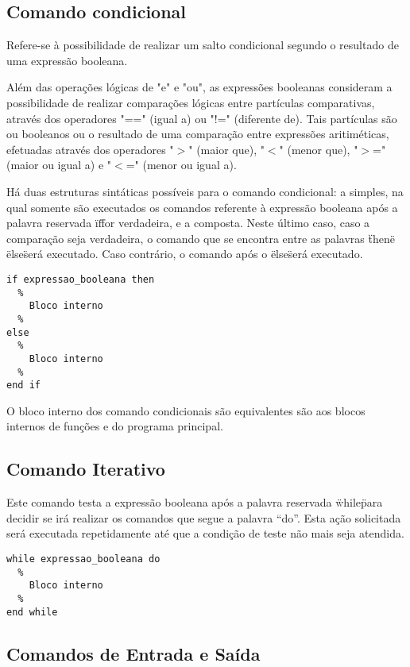   \subsection{Comando condicional}

  Refere-se à possibilidade de realizar um salto condicional segundo o resultado de uma expressão booleana. 

  Além das operações lógicas de "e" e "ou", as expressões booleanas consideram a possibilidade de realizar comparações lógicas entre partículas comparativas, através dos operadores "==" (igual a) ou "!=" (diferente de). Tais partículas são ou booleanos ou o resultado de uma comparação entre expressões aritiméticas, efetuadas através dos operadores "$>$" (maior que), "$<$" (menor que), "$>$=" (maior ou igual a) e "$<$=" (menor ou igual a).

  Há duas estruturas sintáticas possíveis para o comando condicional: a simples, na qual somente são executados os comandos referente à expressão booleana após a palavra reservada \"if\" for verdadeira, e a composta. Neste último caso, caso a comparação seja verdadeira, o comando que se encontra entre as palavras \"then\" e \"else\" será executado. Caso contrário, o comando após o \"else\" será executado. 

\begin{lstlisting}
if expressao_booleana then
  %
    Bloco interno
  %
else
  %
    Bloco interno
  %
end if
\end{lstlisting}

  O bloco interno dos comando condicionais são equivalentes são aos blocos internos de funções e do programa principal.

  \subsection{Comando Iterativo}

  Este comando testa a expressão booleana após a palavra reservada \"while\" para decidir se irá realizar os comandos que segue a palavra “do”. Esta ação solicitada será executada repetidamente até que a condição de teste não mais seja atendida.           

\begin{lstlisting}
while expressao_booleana do
  %
    Bloco interno
  %
end while
\end{lstlisting}
                             
  \subsection{Comandos de Entrada e Saída}

